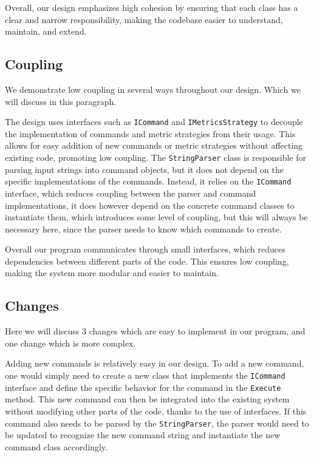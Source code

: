 \documentclass[11pt,a4paper]{article}
\begin{document}
Overall, our design emphasizes high cohesion by ensuring that each class has a clear and narrow responsibility, making the codebase easier to understand, maintain, and extend.

\subsection*{Coupling}

We demonstrate low coupling in several ways throughout our design. Which we will discuss in this paragraph.

The design uses interfaces such as \texttt{ICommand} and \texttt{IMetricsStrategy} to decouple the implementation of commands and metric strategies from their usage. This allows for easy addition of new commands or metric strategies without affecting existing code, promoting low coupling.
The \texttt{StringParser} class is responsible for parsing input strings into command objects, but it does not depend on the specific implementations of the commands. Instead, it relies on the \texttt{ICommand} interface, which reduces coupling between the parser and command implementations, it does however depend on the concrete command classes to instantiate them, which introduces some level of coupling, but this will always be necessary here, since the parser needs to know which commands to create. 

Overall our program communicates through small interfaces, which reduces dependencies between different parts of the code. This ensures low coupling, making the system more modular and easier to maintain.

\subsection*{Changes}

Here we will discuss $3$ changes which are easy to implement in our program, and one change which is more complex. 

Adding new commands is relatively easy in our design. To add a new command, one would simply need to create a new class that implements the \texttt{ICommand} interface and define the specific behavior for the command in the \texttt{Execute} method. This new command can then be integrated into the existing system without modifying other parts of the code, thanks to the use of interfaces. If this command also needs to be parsed by the \texttt{StringParser}, the parser would need to be updated to recognize the new command string and instantiate the new command class accordingly.
\end{document}

